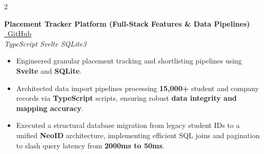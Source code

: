 \documentclass[10pt, a4paper]{article}
\newcommand{\entry}[4]{%
  \vspace{2pt}
  {\bfseries\color{bodytext} #1}\hfill{\small\color{lightgray} #3}\\
  {\small\itshape\color{accent} #2}\hfill{\small\color{lightgray} #4}
  \vspace{2pt}
}
\newenvironment{bullets}{%
  \begin{itemize}[leftmargin=1.1em, itemsep=1pt, topsep=2pt, parsep=0pt]
  \small\color{bodytext}
}{\end{itemize}}
\begin{document}
\begin{paracol}{2}
\begin{rightcolumn}
\begin{minipage}[t]{\dimexpr\linewidth-20pt}

\vspace{4pt}

\entry{Placement Tracker Platform (Full-Stack Features \& Data Pipelines)}%
      {TypeScript \textbullet{} Svelte \textbullet{} SQLite3}%
      {\href{https://github.com/dreamgamer5000}{\faIcon{github}~GitHub}}%
      {}
\begin{bullets}
  \item Engineered granular placement tracking and shortlisting pipelines using \textbf{Svelte} and \textbf{SQLite}.
  \item Architected data import pipelines processing \textbf{15,000+} student and company records via \textbf{TypeScript} scripts, ensuring robust \textbf{data integrity and mapping accuracy}.
  \item Executed a structural database migration from legacy student IDs to a unified \textbf{NeoID} architecture, implementing efficient SQL joins and pagination to slash query latency from \textbf{2000ms to 50ms}.
\end{bullets}

\vspace{4pt}


\end{minipage}
\end{rightcolumn}
\end{paracol}
\end{document}
